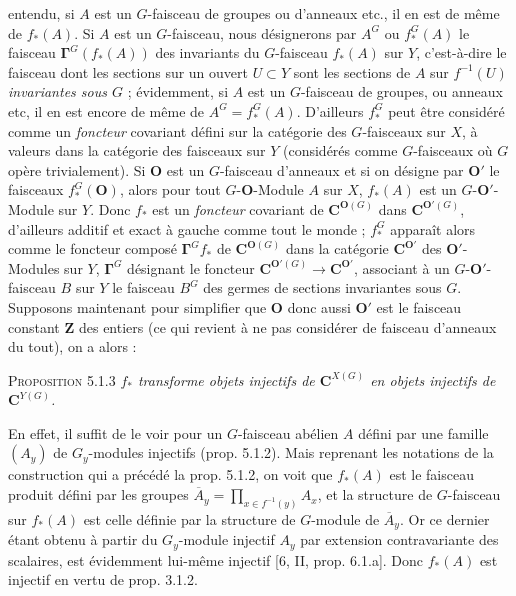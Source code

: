 \clearpage
{}

entendu, si $A$ est un $G$-faisceau de groupes ou d'anneaux etc., il en est de
même de $f_*(A)$.
Si $A$ est un $G$-faisceau, nous désignerons par $A^G$ ou $f_*^G(A)$ le
faisceau $\mathbf{\Gamma}^G(f_*(A))$ des invariants du $G$-faisceau $f_*(A)$ sur $Y$,
c'est-à-dire le faisceau dont les sections sur un ouvert $U\subset Y$ sont les
sections de $A$ sur $f^{-1}(U)$ \textit{invariantes sous $G$} ; évidemment, si $A$ est
un $G$-faisceau de groupes, ou anneaux etc, il en est encore de même de
$A^G=f_*^G(A)$.
D'ailleurs $f_*^G$ peut être considéré comme un \textit{foncteur} covariant
défini sur la catégorie des $G$-faisceaux sur $X$, à valeurs dans la catégorie
des faisceaux sur $Y$ (considérés comme $G$-faisceaux où $G$ opère
trivialement). Si ${\mathbf O}$ est un $G$-faisceau d'anneaux et si on désigne par ${\mathbf O}'$
le faisceaux $f_*^G({\mathbf O})$, alors pour tout $G$-${\mathbf O}$-Module $A$ sur $X$, $f_*(A)$
est un $G$-${\mathbf O}'$-Module sur $Y$. Donc $f_*$ est un \textit{foncteur} covariant
de ${\mathbf C}^{{\mathbf O}(G)}$ dans ${\mathbf C}^{{\mathbf O}'(G)}$, d'ailleurs additif et exact à gauche comme
tout le monde ; $f_*^G$ apparaît alors comme le foncteur composé
$\mathbf{\Gamma}^Gf_*$ de ${\mathbf C}^{{\mathbf O}(G)}$ dans la catégorie ${\mathbf C}^{{\mathbf O}'}$ des ${\mathbf O}'$-Modules sur
$Y$, $\mathbf{\Gamma}^G$ désignant le foncteur
${\mathbf C}^{{\mathbf O}'(G)}\to {\mathbf C}^{{\mathbf O}'}$, associant à un $G$-${\mathbf O}'$-faisceau $B$ sur
$Y$ le faisceau $B^G$ des germes de sections invariantes sous $G$. Supposons
maintenant pour simplifier que ${\mathbf O}$ donc aussi ${\mathbf O}'$ est le faisceau constant
$\mathbf Z$ des entiers (ce qui revient à ne pas considérer de faisceau
d'anneaux du tout), on a alors :

\textsc{Proposition 5.1.3} \textit{$f_*$ transforme objets injectifs
de ${\mathbf C}^{X(G)}$ en objets injectifs de ${\mathbf C}^{Y(G)}$.}

En effet, il suffit de le voir pour un $G$-faisceau abélien $A$ défini par une
famille $(A_y)$ de $G_y$-modules injectifs (prop. 5.1.2). Mais reprenant les
notations de la construction qui a précédé la prop. 5.1.2, on voit que
$f_*(A)$ est le faisceau produit défini par les groupes $\overline A_y=\displaystyle\prod_{x\in f^{-1}(y)}A_x$,
et la structure de $G$-faisceau sur $f_*(A)$ est celle définie par la structure
de $G$-module de $\overline A_y$. Or ce dernier étant obtenu à partir du
$G_y$-module injectif $A_y$ par extension contravariante des scalaires, est
évidemment lui-même injectif [6, II, prop. 6.1.a]. Donc $f_*(A)$ est injectif
en vertu de prop. 3.1.2.

